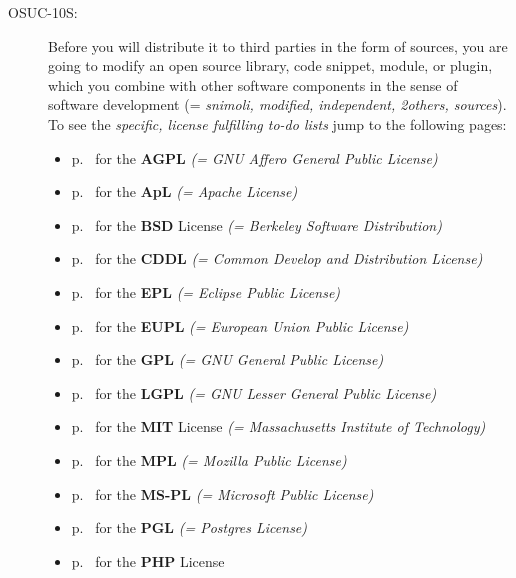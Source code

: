 \begin{description}
\item[OSUC-10S:]\label{OSUC-10S-DEF} Before you will distribute it to third parties
in the form of sources, you are going to modify an open source library, code
snippet, module, or plugin, which you combine with other software components in
the sense of software development (= \textit{snimoli, modified, independent,
2others, sources}). To see the \textit{specific, license fulfilling to-do lists}
jump to the following pages:
  \begin{itemize}
    \item p.\ \pageref{OSUC-10S-AGPL} for the \textbf{AGPL}
      \textit{(= GNU Affero General Public License)} 
    \item p.\ \pageref{OSUC-10S-Apache20} for the \textbf{ApL}
      \textit{(= Apache License)}
    \item p.\ \pageref{OSUC-10S-BSD} for the \textbf{BSD} License
      \textit{(= Berkeley Software Distribution)}
    \item p.\ \pageref{OSUC-10S-CDDL} for the \textbf{CDDL}
      \textit{(= Common Develop and Distribution License)}  
    \item p.\ \pageref{OSUC-10S-EPL} for the \textbf{EPL}
      \textit{(= Eclipse Public License)}     
    \item p.\ \pageref{OSUC-10S-EUPL} for the \textbf{EUPL}
      \textit{(= European Union Public License)} 
    \item p.\ \pageref{OSUC-10S-GPL} for the \textbf{GPL}
       \textit{(= GNU General Public License)} 
    \item p.\ \pageref{OSUC-10S-LGPL} for the \textbf{LGPL}
      \textit{(= GNU Lesser General Public License)}           
    \item p.\ \pageref{OSUC-10S-MIT} for the \textbf{MIT} License
       \textit{(= Massachusetts Institute of Technology)} 
    \item p.\ \pageref{OSUC-10S-MPL} for the \textbf{MPL}
      \textit{(= Mozilla Public License)}     
    \item p.\ \pageref{OSUC-10S-MS-PL} for the \textbf{MS-PL}
      \textit{(= Microsoft Public License)} 
    \item p.\ \pageref{OSUC-10S-PGL} for the \textbf{PGL}
      \textit{(= Postgres License)} 
    \item p.\ \pageref{OSUC-10S-PHP} for the \textbf{PHP} License 
  \end{itemize}


\end{description}
